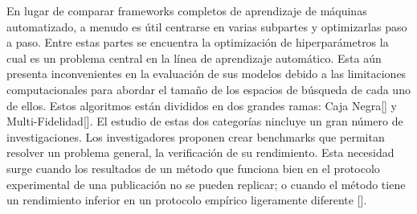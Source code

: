 
En lugar de comparar frameworks completos de aprendizaje de máquinas automatizado, a menudo es útil centrarse en varias subpartes y optimizarlas paso a paso.
Entre estas partes se encuentra la optimización de hiperparámetros la cual es un problema central en la línea de aprendizaje automático. Esta aún presenta 
inconvenientes en la evaluación de sus modelos debido a las limitaciones computacionales para abordar el tamaño de los espacios de búsqueda de cada uno de ellos. Estos 
algoritmos están divididos en dos grandes ramas: Caja Negra[\cite{35}] y Multi-Fidelidad[\cite{35}]. El estudio de estas dos categorías nincluye un gran número de investigaciones. 
Los investigadores proponen crear benchmarks que permitan resolver un problema general, la verificación de su rendimiento. Esta necesidad surge cuando los resultados de 
un método que funciona bien en el protocolo experimental de una publicación no se pueden replicar; o cuando el método tiene un rendimiento inferior en un protocolo 
empírico ligeramente diferente [\cite{61}]. 

